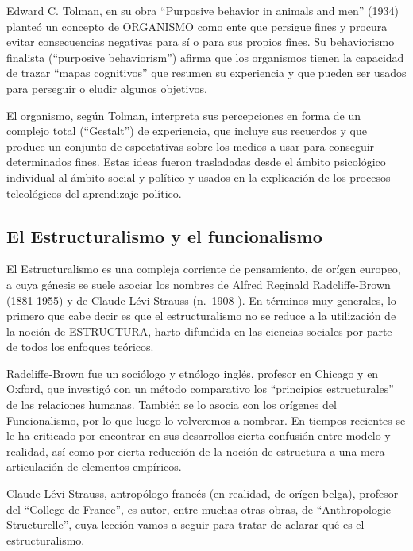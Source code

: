 \documentclass[
]{book}
\begin{document}
Edward C. Tolman, en su obra ``Purposive behavior in animals and men'' (1934) planteó un concepto de ORGANISMO como ente que persigue fines y procura evitar consecuencias negativas para sí o para sus propios fines. Su behaviorismo finalista (``purposive behaviorism'') afirma que los organismos tienen la capacidad de trazar ``mapas cognitivos'' que resumen su experiencia y que pueden ser usados para perseguir o eludir algunos objetivos.

El organismo, según Tolman, interpreta sus percepciones en forma de un complejo total (``Gestalt'') de experiencia, que incluye sus recuerdos y que produce un conjunto de espectativas sobre los medios a usar para conseguir determinados fines. Estas ideas fueron trasladadas desde el ámbito psicológico individual al ámbito social y político y usados en la explicación de los procesos teleológicos del aprendizaje político.

\hypertarget{el-estructuralismo-y-el-funcionalismo}{%
\subsection*{El Estructuralismo y el funcionalismo}\label{el-estructuralismo-y-el-funcionalismo}}

El Estructuralismo es una compleja corriente de pensamiento, de orígen europeo, a cuya génesis se suele asociar los nombres de Alfred Reginald Radcliffe-Brown (1881-1955) y de Claude Lévi-Strauss (n.~1908 ). En términos muy generales, lo primero que cabe decir es que el estructuralismo no se reduce a la utilización de la noción de ESTRUCTURA, harto difundida en las ciencias sociales por parte de todos los enfoques teóricos.

Radcliffe-Brown fue un sociólogo y etnólogo inglés, profesor en Chicago y en Oxford, que investigó con un método comparativo los ``principios estructurales'' de las relaciones humanas. También se lo asocia con los orígenes del Funcionalismo, por lo que luego lo volveremos a nombrar. En tiempos recientes se le ha criticado por encontrar en sus desarrollos cierta confusión entre modelo y realidad, así como por cierta reducción de la noción de estructura a una mera articulación de elementos empíricos.

Claude Lévi-Strauss, antropólogo francés (en realidad, de orígen belga), profesor del ``College de France'', es autor, entre muchas otras obras, de ``Anthropologie Structurelle'', cuya lección vamos a seguir para tratar de aclarar qué es el estructuralismo.
\end{document}
